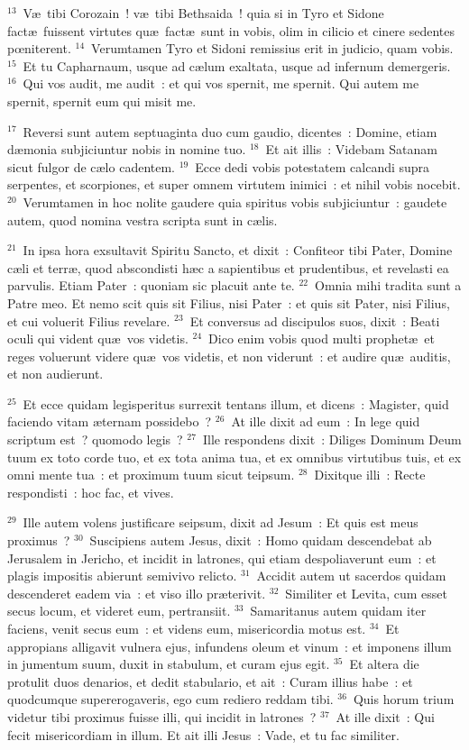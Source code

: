 ${}^{13}$~V\ae\ tibi Corozain~! v\ae\ tibi Bethsaida~! quia si in Tyro et Sidone fact\ae\ fuissent virtutes qu\ae\ fact\ae\ sunt in vobis, olim in cilicio et cinere sedentes pœniterent.
${}^{14}$~Verumtamen Tyro et Sidoni remissius erit in judicio, quam vobis.
${}^{15}$~Et tu Capharnaum, usque ad c\ae lum exaltata, usque ad infernum demergeris.
${}^{16}$~Qui vos audit, me audit~: et qui vos spernit, me spernit. Qui autem me spernit, spernit eum qui misit me.


${}^{17}$~Reversi sunt autem septuaginta duo cum gaudio, dicentes~: Domine, etiam d\ae monia subjiciuntur nobis in nomine tuo.
${}^{18}$~Et ait illis~: Videbam Satanam sicut fulgor de c\ae lo cadentem.
${}^{19}$~Ecce dedi vobis potestatem calcandi supra serpentes, et scorpiones, et super omnem virtutem inimici~: et nihil vobis nocebit.
${}^{20}$~Verumtamen in hoc nolite gaudere quia spiritus vobis subjiciuntur~: gaudete autem, quod nomina vestra scripta sunt in c\ae lis.


${}^{21}$~In ipsa hora exsultavit Spiritu Sancto, et dixit~: Confiteor tibi Pater, Domine c\ae li et terr\ae , quod abscondisti h\ae c a sapientibus et prudentibus, et revelasti ea parvulis. Etiam Pater~: quoniam sic placuit ante te.
${}^{22}$~Omnia mihi tradita sunt a Patre meo. Et nemo scit quis sit Filius, nisi Pater~: et quis sit Pater, nisi Filius, et cui voluerit Filius revelare.
${}^{23}$~Et conversus ad discipulos suos, dixit~: Beati oculi qui vident qu\ae\ vos videtis.
${}^{24}$~Dico enim vobis quod multi prophet\ae\ et reges voluerunt videre qu\ae\ vos videtis, et non viderunt~: et audire qu\ae\ auditis, et non audierunt.


${}^{25}$~Et ecce quidam legisperitus surrexit tentans illum, et dicens~: Magister, quid faciendo vitam \ae ternam possidebo~?
${}^{26}$~At ille dixit ad eum~: In lege quid scriptum est~? quomodo legis~?
${}^{27}$~Ille respondens dixit~: Diliges Dominum Deum tuum ex toto corde tuo, et ex tota anima tua, et ex omnibus virtutibus tuis, et ex omni mente tua~: et proximum tuum sicut teipsum.
${}^{28}$~Dixitque illi~: Recte respondisti~: hoc fac, et vives.


${}^{29}$~Ille autem volens justificare seipsum, dixit ad Jesum~: Et quis est meus proximus~?
${}^{30}$~Suscipiens autem Jesus, dixit~: Homo quidam descendebat ab Jerusalem in Jericho, et incidit in latrones, qui etiam despoliaverunt eum~: et plagis impositis abierunt semivivo relicto.
${}^{31}$~Accidit autem ut sacerdos quidam descenderet eadem via~: et viso illo pr\ae terivit.
${}^{32}$~Similiter et Levita, cum esset secus locum, et videret eum, pertransiit.
${}^{33}$~Samaritanus autem quidam iter faciens, venit secus eum~: et videns eum, misericordia motus est.
${}^{34}$~Et appropians alligavit vulnera ejus, infundens oleum et vinum~: et imponens illum in jumentum suum, duxit in stabulum, et curam ejus egit.
${}^{35}$~Et altera die protulit duos denarios, et dedit stabulario, et ait~: Curam illius habe~: et quodcumque supererogaveris, ego cum rediero reddam tibi.
${}^{36}$~Quis horum trium videtur tibi proximus fuisse illi, qui incidit in latrones~?
${}^{37}$~At ille dixit~: Qui fecit misericordiam in illum. Et ait illi Jesus~: Vade, et tu fac similiter.


